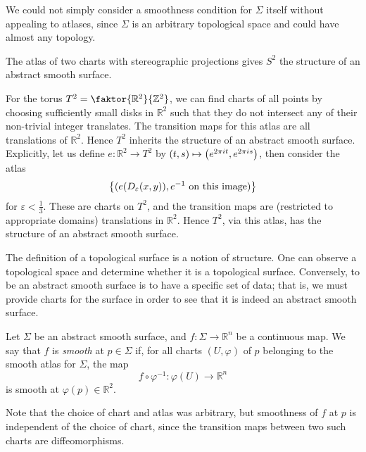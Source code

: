 \begin{remark}
	We could not simply consider a smoothness condition for \( \Sigma \) itself without appealing to atlases, since \( \Sigma \) is an arbitrary topological space and could have almost any topology.
\end{remark}
\begin{example}
	The atlas of two charts with stereographic projections gives \( S^2 \) the structure of an abstract smooth surface.
\end{example}
\begin{example}
	For the torus \( T^2 = \faktor{\mathbb R^2}{\mathbb Z^2} \), we can find charts of all points by choosing sufficiently small disks in \( \mathbb R^2 \) such that they do not intersect any of their non-trivial integer translates.
	The transition maps for this atlas are all translations of \( \mathbb R^2 \).
	Hence \( T^2 \) inherits the structure of an abstract smooth surface.
	Explicitly, let us define \( e \colon \mathbb R^2 \to T^2 \) by \( (t,s) \mapsto \qty(e^{2\pi i t}, e^{2 \pi i s}) \), then consider the atlas
	\[ \qty{(e\qty(D_\varepsilon(x,y)), e^{-1} \text{ on this image})} \]
	for \( \varepsilon < \frac{1}{3} \).
	These are charts on \( T^2 \), and the transition maps are (restricted to appropriate domains) translations in \( \mathbb R^2 \).
	Hence \( T^2 \), via this atlas, has the structure of an abstract smooth surface.
\end{example}
\begin{remark}
	The definition of a topological surface is a notion of structure.
	One can observe a topological space and determine whether it is a topological surface.
	Conversely, to be an abstract smooth surface is to have a specific set of data; that is, we must provide charts for the surface in order to see that it is indeed an abstract smooth surface.
\end{remark}
\begin{definition}
	Let \( \Sigma \) be an abstract smooth surface, and \( f \colon \Sigma \to \mathbb R^n \) be a continuous map.
	We say that \( f \) is \textit{smooth} at \( p \in \Sigma \) if, for all charts \( (U, \varphi) \) of \( p \) belonging to the smooth atlas for \( \Sigma \), the map
	\[ f \circ \varphi^{-1} \colon \varphi(U) \to \mathbb R^n \]
	is smooth at \( \varphi(p) \in \mathbb R^2 \).
\end{definition}
\begin{remark}
	Note that the choice of chart and atlas was arbitrary, but smoothness of \( f \) at \( p \) is independent of the choice of chart, since the transition maps between two such charts are diffeomorphisms.
\end{remark}
